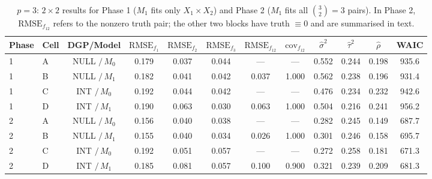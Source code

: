 \begin{table}[!ht]
\centering
\small
\caption{$p=3$: $2\times 2$ results for Phase 1 ($M_1$ fits only $X_1\times X_2$) and
Phase 2 ($M_1$ fits all $\binom{3}{2}=3$ pairs). In Phase 2, $\mathrm{RMSE}_{f_{12}}$
refers to the nonzero truth pair; the other two blocks have truth $\equiv 0$ and are
summarised in text.}
\label{tab:int_p3}
\begin{tabular}{llcccccccccc}
\toprule
Phase & Cell & DGP/Model & $\mathrm{RMSE}_{f_1}$ & $\mathrm{RMSE}_{f_2}$ & $\mathrm{RMSE}_{f_3}$ &
$\mathrm{RMSE}_{f_{12}}$ & $\mathrm{cov}_{f_{12}}$ &
$\hat\sigma^2$ & $\hat\tau^2$ & $\hat\rho$ & WAIC \\
\midrule
1 & A & NULL $/\,M_0$ & 0.179 & 0.037 & 0.044 & ---   & ---   & 0.552 & 0.244 & 0.198 & 935.6 \\
1 & B & NULL $/\,M_1$ & 0.182 & 0.041 & 0.042 & 0.037 & 1.000 & 0.562 & 0.238 & 0.196 & 931.4 \\
1 & C & INT $/\,M_0$  & 0.192 & 0.044 & 0.042 & ---   & ---   & 0.476 & 0.234 & 0.232 & 942.6 \\
1 & D & INT $/\,M_1$  & 0.190 & 0.063 & 0.030 & 0.063 & 1.000 & 0.504 & 0.216 & 0.241 & 956.2 \\
\midrule
2 & A & NULL $/\,M_0$ & 0.156 & 0.040 & 0.038 & ---   & ---   & 0.282 & 0.245 & 0.149 & 687.7 \\
2 & B & NULL $/\,M_1$ & 0.155 & 0.040 & 0.034 & 0.026 & 1.000 & 0.301 & 0.246 & 0.158 & 695.7 \\
2 & C & INT $/\,M_0$  & 0.192 & 0.051 & 0.057 & ---   & ---   & 0.272 & 0.258 & 0.181 & 671.3 \\
2 & D & INT $/\,M_1$  & 0.185 & 0.081 & 0.057 & 0.100 & 0.900 & 0.321 & 0.239 & 0.209 & 681.3 \\
\bottomrule
\end{tabular}
\end{table}

